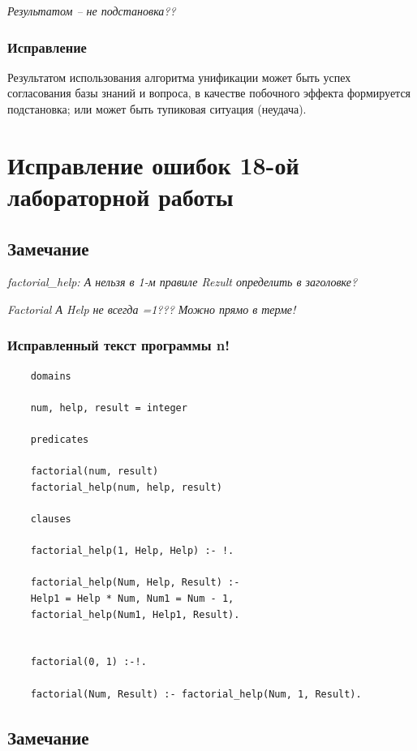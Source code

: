 \documentclass[a4paper,12pt]{article}
\begin{document}
	\textit{Результатом – не подстановка??}
	
	\subsubsection*{Исправление}
	
	Результатом использования алгоритма унификации может быть успех согласования базы знаний и вопроса, в качестве побочного эффекта формируется подстановка; или может быть тупиковая ситуация (неудача).
	
	\section*{Исправление ошибок 18-ой лабораторной работы}
	
	\subsection*{Замечание}
	
	
	\textit{factorial\_help: А нельзя в  1-м правиле Rezult определить в заголовке?}
	
	\textit{Factorial  А Help не всегда =1??? Можно прямо в терме!}

	\subsubsection*{Исправленный текст программы n!}
	
	\begin{verbatim}
	domains
	
	num, help, result = integer
	
	predicates
	
	factorial(num, result)
	factorial_help(num, help, result)
	
	clauses
	
	factorial_help(1, Help, Help) :- !.
	
	factorial_help(Num, Help, Result) :- 
	Help1 = Help * Num, Num1 = Num - 1, 
	factorial_help(Num1, Help1, Result).
	
	
	factorial(0, 1) :-!.
	
	factorial(Num, Result) :- factorial_help(Num, 1, Result).
	\end{verbatim}
	
	\subsection*{Замечание}
	
\end{document}
